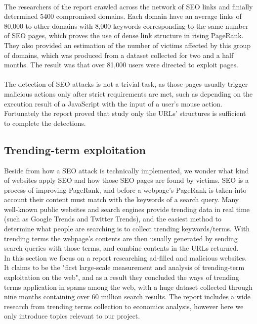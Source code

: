 \paragraph{} 
The
researchers of the report crawled across the network of SEO links and finially
determined 5400 compromised domains. Each domain have an average links of
80,000 to other domains with 8,000 keywords corresponding to the same number of
SEO pages, which proves the use of dense link structure in rising PageRank.
They also provided an estimation of the number of victims affected by this
group of domains, which was produced from a dataset collected for two and a
half months. The result was that over 81,000 users were directed to exploit
pages.
\paragraph{} 
The detection of SEO attacks is not a trivial task, as
those pages usually trigger malicious actions only after strict requirements
are met, such as depending on the execution result of a JavaScript with the
input of a user's mouse action. Fortunately the report proved that study only
the URLs' structures is sufficient to complete the detections. 


\subsection*{Trending-term exploitation}
Beside from how a SEO attack is technically implemented, we wonder what kind 
of websites apply SEO and how those SEO pages are found by victims. SEO is a 
process of improving PageRank, and before a webpage's PageRank is taken into 
account their content must match with the keywords of a search query. Many
well-known public websites and search engines provide trending data in real
time (such as Google Trends and Twitter Trends), and the easiest method to
determine what people are searching is to collect trending keywords/terms. With
trending terms the webpage's contents are then usually generated by sending
search queries with those terms, and combine contents in the URLs returned.\\
In this section we focus on a report researching ad-filled and malicious
websites.\cite{fashioncrime} It claims to be the "first large-scale measurement
and analysis of trending-term exploitation on the web", and as a result they
concluded the ways of trending terms application in spams among the web, with a
huge dataset collected through nine months containing over 60 million search
results. The report includes a wide research from trending terms collection to 
economics analysis, however here we only introduce topics relevant to our 
project. 
